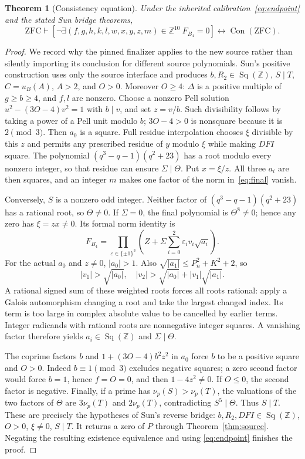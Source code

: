 \documentclass[11pt]{article}
\newtheorem{theorem}{Theorem}
\newcommand{\Z}{\mathbb Z}\newcommand{\N}{\mathbb N}
\newcommand{\Sq}{\operatorname{Sq}(\Z)}
\begin{document}
\begin{theorem}[Consistency equation]
Under the inherited calibration~\eqref{eq:endpoint} and the stated Sun
bridge theorems,
\[
 \mathrm{ZFC}\vdash
 \left[\neg\exists(f,g,h,k,l,w,x,y,z,m)\in\Z^{10}\ F_{B_4}=0\right]
 \longleftrightarrow\operatorname{Con}(\mathrm{ZFC}).
\]
\end{theorem}
\begin{proof}
We record why the pinned finalizer applies to the new source rather than
silently importing its conclusion for different source polynomials.
Sun's positive construction uses only the source interface and produces
$b,R_2\in\Sq$, $S\mid T$, $C=u_B(A)$, $A>2$, and $O>0$.
Moreover $O\ge4$: $\Delta$ is a positive multiple of $g\ge b\ge4$,
and $f,l$ are nonzero.
Choose a nonzero Pell solution
$u^2-(3O-4)v^2=1$ with $b\mid v$, and set $z=v/b$.
Such divisibility follows by taking a power of a Pell unit modulo $b$;
$3O-4>0$ is nonsquare because it is $2\pmod3$.
Then $a_0$ is a square.
Full residue interpolation chooses $\xi$ divisible by this $z$ and permits
any prescribed residue of $y$ modulo $\xi$ while making $DFI$ square.
The polynomial $(q^3-q-1)(q^2+23)$ has a root modulo every nonzero integer,
so that residue can ensure $\Sigma\mid\Theta$. Put $x=\xi/z$.
All three $a_i$ are then squares, and an integer $m$ makes one factor of
the norm in~\eqref{eq:final} vanish.

Conversely, $S$ is a nonzero odd integer. Neither factor of
$(q^3-q-1)(q^2+23)$ has a rational root, so $\Theta\ne0$.
If $\Sigma=0$, the final polynomial is $\Theta^8\ne0$; hence any zero
has $\xi=zx\ne0$. Its formal norm identity is
\[
 F_{B_4}=\prod_{\varepsilon\in\{\pm1\}^3}
 \left(Z+\Sigma\sum_{i=0}^2\varepsilon_i v_i\sqrt{a_i}\right).
\]
For the actual $a_0$ and $z\ne0$, $|a_0|>1$.
Also $\sqrt{|a_1|}\le P_n^2+K^2+2$, so
\[
 |v_1|>\sqrt{|a_0|},\quad
 |v_2|>\sqrt{|a_0|}+|v_1|\sqrt{|a_1|}.
\]
A rational signed sum of these weighted roots forces all roots rational:
apply a Galois automorphism changing a root and take the largest changed
index. Its term is too large in complex absolute value to be cancelled
by earlier terms. Integer radicands with rational roots are nonnegative
integer squares. A vanishing factor therefore yields $a_i\in\Sq$ and
$\Sigma\mid\Theta$.

The coprime factors $b$ and $1+(3O-4)b^2z^2$ in $a_0$ force $b$ to be
a positive square and $O>0$. Indeed $b\equiv1\pmod3$ excludes negative
squares; a zero second factor would force $b=1$, hence $f=O=0$, and then
$1-4z^2\ne0$. If $O\le0$, the second factor is negative.
Finally, if a prime has $\nu_p(S)>\nu_p(T)$, the valuations of the two
factors of $\Theta$ are $3\nu_p(T)$ and $2\nu_p(T)$, contradicting
$S^5\mid\Theta$. Thus $S\mid T$.
These are precisely the hypotheses of Sun's reverse bridge:
$b,R_2,DFI\in\Sq$, $O>0$, $\xi\ne0$, $S\mid T$.
It returns a zero of $P$ through Theorem~\ref{thm:source}.
Negating the resulting existence equivalence and using
\eqref{eq:endpoint} finishes the proof.


\end{proof}
\end{document}
